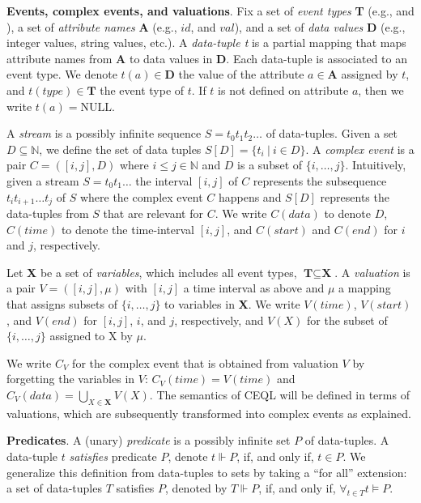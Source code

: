 \textbf{Events, complex events, and valuations}. Fix a set of \emph{event types} \textbf{T} (e.g.,  and ), a set of \emph{attribute names} \textbf{A} (e.g., $id$, and $val$), and a set of \emph{data values} \textbf{D} (e.g., integer values, string values, etc.). A \emph{data-tuple t} is a partial mapping that maps attribute names from \textbf{A} to data values in \textbf{D}. Each data-tuple is associated to an event type. We denote $t(a) \in \textbf{D}$ the value of the attribute $a \in \textbf{A}$ assigned by $t$, and $t(type) \in \textbf{T}$ the event type of $t$. If $t$ is not defined on attribute $a$, then we write $t(a) = \text{NULL}$.

A \emph{stream} is a possibly infinite sequence $S = t_{0}t_{1}t_{2}\ldots$ of data-tuples. Given a set $D \subseteq \mathbb{N}$, we define the set of data tuples $S[D] = \{ t_{i} \ | \ i \in D\}$. A \emph{complex event} is a pair $C = ([i,j], D)$ where $i \le j \in \mathbb{N}$ and $D$ is a subset of $\{i, \ldots, j\}$. Intuitively, given a stream $S = t_{0}t_{1}\ldots$ the interval $[i, j]$ of $C$ represents the subsequence $t_{i}t_{i+1} \ldots t_{j}$ of $S$ where the complex event $C$ happens and $S[D]$ represents the data-tuples from $S$ that are relevant for $C$. We write $C(data)$ to denote $D$, $C(time)$ to denote the time-interval $[i, j]$, and $C(start)$ and $C(end)$ for $i$ and $j$, respectively.

Let \textbf{X} be a set of \emph{variables}, which includes all event types, $\textbf{T} \subseteq \textbf{X}$. A \emph{valuation} is a pair $V = ([i, j], \mu)$ with $[i,j]$ a time interval as above and $\mu$ a mapping that assigns subsets of $\{i, \ldots, j\}$ to variables in \textbf{X}. We write $V(time)$, $V(start)$, and $V(end)$ for $[i,j]$, $i$, and $j$, respectively, and $V(X)$ for the subset of $\{i,\ldots, j\}$ assigned to X by $\mu$.

We write $C_{V}$ for the complex event that is obtained from valuation $V$ by forgetting the variables in $V$: $C_{V}(time) = V(time)$ and $C_{V}(data) = \bigcup\limits_{X \in \textbf{X}} V(X)$. The semantics of CEQL will be defined in terms of valuations, which are subsequently transformed into complex events as explained.

\textbf{Predicates}. A (unary) \emph{predicate} is a possibly infinite set $P$ of data-tuples. A data-tuple $t$ \emph{satisfies} predicate $P$, denote $t \Vdash P$, if, and only if, $t \in P$. We generalize this definition from data-tuples to sets by taking a ``for all'' extension: a set of data-tuples $T$ satisfies $P$, denoted by $T \Vdash P$, if, and only if, $\displaystyle\mathop{\forall}_{t \in T} t \vDash P$.

